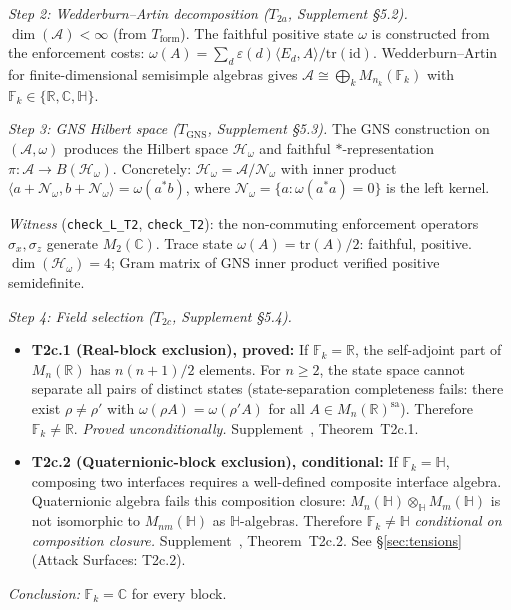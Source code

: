 \documentclass[11pt]{article}
\begin{document}
\noindent\textit{Step 2: Wedderburn--Artin decomposition ($T_{2a}$, Supplement §5.2).}\quad
$\dim(\mathcal{A}) < \infty$ (from $T_{\mathrm{form}}$).  The faithful positive state $\omega$ is constructed from the enforcement costs: $\omega(A) = \sum_d \varepsilon(d) \langle E_d, A \rangle / \mathrm{tr}(\mathrm{id})$.  Wedderburn--Artin for finite-dimensional semisimple algebras gives $\mathcal{A} \cong \bigoplus_k M_{n_k}(\mathbb{F}_k)$ with $\mathbb{F}_k \in \{\mathbb{R}, \mathbb{C}, \mathbb{H}\}$.

\noindent\textit{Step 3: GNS Hilbert space ($T_{\mathrm{GNS}}$, Supplement §5.3).}\quad
The GNS construction on $(\mathcal{A}, \omega)$ produces the Hilbert space $\mathcal{H}_\omega$ and faithful $*$-representation $\pi: \mathcal{A} \to B(\mathcal{H}_\omega)$.  Concretely: $\mathcal{H}_\omega = \mathcal{A}/\mathcal{N}_\omega$ with inner product $\langle a + \mathcal{N}_\omega, b + \mathcal{N}_\omega \rangle = \omega(a^* b)$, where $\mathcal{N}_\omega = \{a : \omega(a^*a) = 0\}$ is the left kernel.

\textit{Witness} (\texttt{check\_L\_T2}, \texttt{check\_T2}): the non-commuting enforcement operators $\sigma_x, \sigma_z$ generate $M_2(\mathbb{C})$.  Trace state $\omega(A) = \mathrm{tr}(A)/2$: faithful, positive.  $\dim(\mathcal{H}_\omega) = 4$; Gram matrix of GNS inner product verified positive semidefinite.

\noindent\textit{Step 4: Field selection ($T_{2c}$, Supplement §5.4).}\quad
\begin{itemize}[nosep,leftmargin=2em]
\item \textbf{T2c.1 (Real-block exclusion), proved:} If $\mathbb{F}_k = \mathbb{R}$, the self-adjoint part of $M_n(\mathbb{R})$ has $n(n{+}1)/2$ elements.  For $n \ge 2$, the state space cannot separate all pairs of distinct states (state-separation completeness fails: there exist $\rho \ne \rho'$ with $\omega(\rho A) = \omega(\rho' A)$ for all $A \in M_n(\mathbb{R})^{\mathrm{sa}}$).  Therefore $\mathbb{F}_k \ne \mathbb{R}$.  \textit{Proved unconditionally.}  Supplement~\cite{Supp}, Theorem~T2c.1.
\item \textbf{T2c.2 (Quaternionic-block exclusion), conditional:} If $\mathbb{F}_k = \mathbb{H}$, composing two interfaces requires a well-defined composite interface algebra.  Quaternionic algebra fails this composition closure: $M_n(\mathbb{H}) \otimes_{\mathbb{H}} M_m(\mathbb{H})$ is not isomorphic to $M_{nm}(\mathbb{H})$ as $\mathbb{H}$-algebras.  Therefore $\mathbb{F}_k \ne \mathbb{H}$ \textit{conditional on composition closure.}  Supplement~\cite{Supp}, Theorem~T2c.2.  See §\ref{sec:tensions} (Attack Surfaces: T2c.2).
\end{itemize}
\textit{Conclusion:} $\mathbb{F}_k = \mathbb{C}$ for every block.
\end{document}
